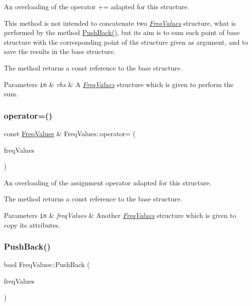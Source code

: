 An overloading of the operator += adapted for this structure. 

This method is not intended to concatenate two {\itshape \hyperlink{structFreqValues}{Freq\+Values}} structure, what is performed by the method {\ttfamily \hyperlink{structFreqValues_a01315cf6bb4ed4e21ee1b6441c44a850}{Push\+Back()}}, but its aim is to sum each point of base structure with the corresponding point of the structure given as argument, and to save the results in the base structure.

The method returns a {\ttfamily const} reference to the base structure. 
\begin{DoxyParams}[1]{Parameters}
\mbox{\tt in}  & {\em rhs} & A {\itshape \hyperlink{structFreqValues}{Freq\+Values}} structure which is given to perform the sum. \\
\hline
\end{DoxyParams}
\mbox{\label{structFreqValues_a11021e293ec300860ffc503d3c37a58c}} 
\subsubsection{\texorpdfstring{operator=()}{operator=()}}
{\footnotesize\ttfamily const \hyperlink{structFreqValues}{Freq\+Values} \& Freq\+Values\+::operator= (\begin{DoxyParamCaption}\item[{const \hyperlink{structFreqValues}{Freq\+Values} \&}]{freq\+Values }\end{DoxyParamCaption})}



An overloading of the assignment operator adapted for this structure. 

The method returns a {\ttfamily const} reference to the base structure. 
\begin{DoxyParams}[1]{Parameters}
\mbox{\tt in}  & {\em freq\+Values} & Another {\itshape \hyperlink{structFreqValues}{Freq\+Values}} structure which is given to copy its attributes. \\
\hline
\end{DoxyParams}
\mbox{\label{structFreqValues_a01315cf6bb4ed4e21ee1b6441c44a850}} 
\subsubsection{\texorpdfstring{Push\+Back()}{PushBack()}}
{\footnotesize\ttfamily bool Freq\+Values\+::\+Push\+Back (\begin{DoxyParamCaption}\item[{const \hyperlink{structFreqValues}{Freq\+Values} \&}]{freq\+Values }\end{DoxyParamCaption})}



